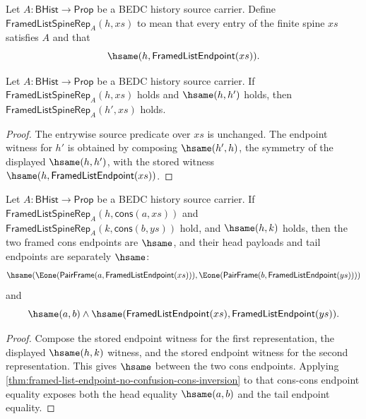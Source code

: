 \begin{definition}
\label{def:framed-list-spine-representation}
Let $A:\mathsf{BHist}\to\mathsf{Prop}$ be a BEDC history source carrier. Define
$\mathsf{FramedListSpineRep}_A(h,xs)$ to mean that every entry of the finite
spine $xs$ satisfies $A$ and that
$$
\hsame(h,\mathsf{FramedListEndpoint}(xs)).
$$
\end{definition}

\begin{theorem}
\label{thm:framed-list-spine-rep-hsame-transport}
Let $A:\mathsf{BHist}\to\mathsf{Prop}$ be a BEDC history source carrier. If
$\mathsf{FramedListSpineRep}_A(h,xs)$ holds and $\hsame(h,h')$ holds, then
$\mathsf{FramedListSpineRep}_A(h',xs)$ holds.
\end{theorem}
\begin{proof}
The entrywise source predicate over $xs$ is unchanged. The endpoint witness for
$h'$ is obtained by composing $\hsame(h',h)$, the symmetry of the displayed
$\hsame(h,h')$, with the stored witness
$\hsame(h,\mathsf{FramedListEndpoint}(xs))$.
\end{proof}

\begin{theorem}
\label{thm:list-spine-rep-cons-endpoint-injective}
Let $A:\mathsf{BHist}\to\mathsf{Prop}$ be a BEDC history source carrier. If
$\mathsf{FramedListSpineRep}_A(h,\mathsf{cons}(a,xs))$ and
$\mathsf{FramedListSpineRep}_A(k,\mathsf{cons}(b,ys))$ hold, and
$\hsame(h,k)$ holds, then the two framed cons endpoints are $\hsame$, and their
head payloads and tail endpoints are separately $\hsame$:
$$
\hsame(\Eone(\mathsf{PairFrame}(a,\mathsf{FramedListEndpoint}(xs))),
\Eone(\mathsf{PairFrame}(b,\mathsf{FramedListEndpoint}(ys))))
$$
and
$$
\hsame(a,b)\land
\hsame(\mathsf{FramedListEndpoint}(xs),\mathsf{FramedListEndpoint}(ys)).
$$
\end{theorem}
\begin{proof}
Compose the stored endpoint witness for the first representation, the displayed
$\hsame(h,k)$ witness, and the stored endpoint witness for the second
representation. This gives $\hsame$ between the two cons endpoints. Applying
\autoref{thm:framed-list-endpoint-no-confusion-cons-inversion} to that cons-cons
endpoint equality exposes both the head equality $\hsame(a,b)$ and the tail
endpoint equality.
\end{proof}

